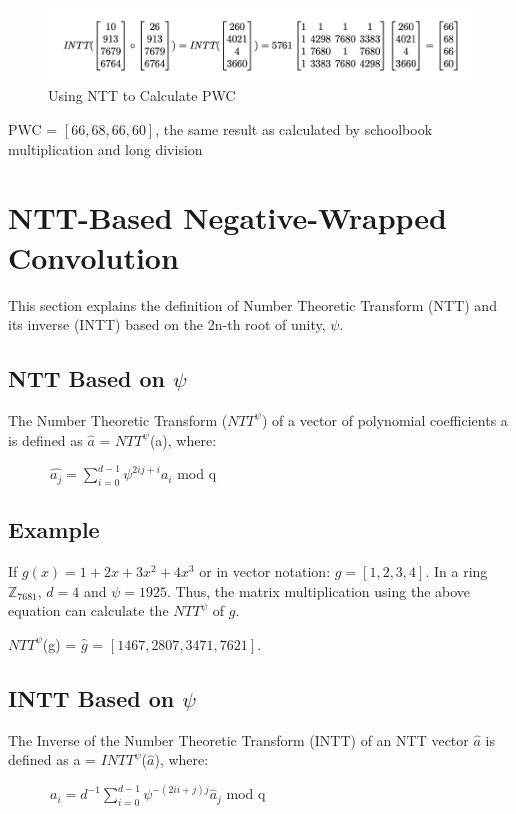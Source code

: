 \documentclass{techrep}
\theoremstyle{definition}
\theoremstyle{plain}
\newcommand{\Z}{\mathbb{Z}}
\begin{document}
\begin{figure}[H]
 	\centering
 	\includegraphics[width=.9\columnwidth]{fig/PWC_NTT.png}
 	\caption{Using NTT to Calculate PWC} 
\label{fig:PWC_NTT}
\end{figure}

PWC = $[66, 68, 66, 60]$, the same result as calculated by schoolbook multiplication and long division 



\section{NTT-Based Negative-Wrapped Convolution}
This section explains the definition of Number Theoretic Transform (NTT) and its inverse (INTT) based on the 2n-th root of unity, $\psi$.

\subsection{NTT Based on $\psi$}
The Number Theoretic Transform (${NTT}^\psi$) of a vector of polynomial coefficients a is defined as $\hat{a}$ = ${NTT}^\psi$(a), where:

$\quad \quad \quad \hat{a_j} = \sum_{i=0}^{d - 1}\psi^{2ij+i}a_i$ mod q

\subsection{Example}

If $g(x) = 1 + 2x + 3x^2 + 4x^3$ or in vector notation:  $g = [1, 2, 3, 4]$. 
In a ring $\Z_{7681}$, $d = 4$ and $\psi =1925$. Thus, the matrix multiplication using the above equation can calculate the ${NTT}^\psi$ of $g$.

${NTT}^\psi$(g) = $\hat{g}$ = $[1467, 2807, 3471, 7621]$. 

\subsection{INTT Based on $\psi$}
The Inverse of the Number Theoretic Transform (INTT) of an NTT vector $\hat{a}$ is defined as a = ${INTT}^\psi$($\hat{a}$), where:

$\quad \quad \quad a_i = d^{-1}\sum_{i=0}^{d - 1}\psi^{-(2ii+j)j}\hat{a}_j$ mod q
\end{document}
